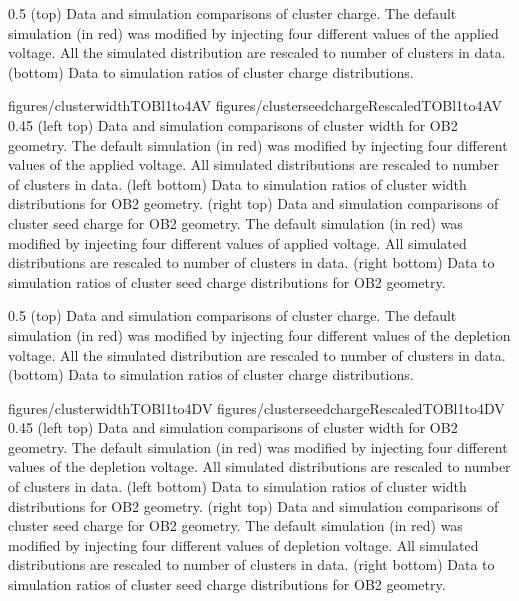                  {0.5}       %
                 { (top) Data and simulation comparisons of cluster charge. The default simulation (in red) was modified by injecting four different values of the applied voltage. All the simulated distribution are rescaled to number of clusters in data. (bottom) Data to simulation ratios of cluster charge distributions. }

                 {figures/clusterwidthTOBl1to4AV}
                 {figures/clusterseedchargeRescaledTOBl1to4AV} %
                 {0.45}       %
                 {(left top) Data and simulation  comparisons of cluster width for OB2 geometry. The default simulation (in red) was modified by injecting four different values of the applied voltage. All simulated distributions are rescaled to number of clusters in data. (left bottom) Data to simulation ratios of cluster width distributions for OB2 geometry. (right top) Data and simulation  comparisons of cluster seed charge for OB2 geometry. The default simulation (in red) was modified by injecting four different values of applied voltage. All simulated distributions are rescaled to number of clusters in data. (right bottom) Data to simulation ratios of cluster seed charge distributions for OB2 geometry. }


                 {0.5}       %
                 { (top) Data and simulation comparisons of cluster charge. The default simulation (in red) was modified by injecting four different values of the depletion voltage. All the simulated distribution are rescaled to number of clusters in data. (bottom) Data to simulation ratios of cluster charge distributions. }

                 {figures/clusterwidthTOBl1to4DV}
                 {figures/clusterseedchargeRescaledTOBl1to4DV} %
                 {0.45}       %
                 {(left top) Data and simulation  comparisons of cluster width for OB2 geometry. The default simulation (in red) was modified by injecting four different values of the depletion voltage. All simulated distributions are rescaled to number of clusters in data. (left bottom) Data to simulation ratios of cluster width distributions for OB2 geometry. (right top) Data and simulation  comparisons of cluster seed charge for OB2 geometry. The default simulation (in red) was modified by injecting four different values of depletion voltage. All simulated distributions are rescaled to number of clusters in data. (right bottom) Data to simulation ratios of cluster seed charge distributions for OB2 geometry. }

